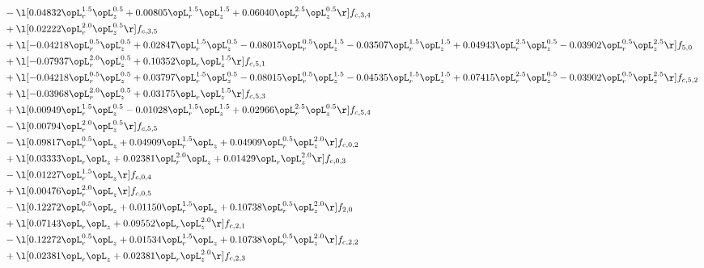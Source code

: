\begin{alignat}{2}
& - \l[  0.04832 \opL_r^{1.5} \opL_z^{0.5} +  0.00805 \opL_r^{1.5} \opL_z^{1.5} +  0.06040 \opL_r^{2.5} \opL_z^{0.5}  \r] f_{c,3,4} \nonumber \\ 
& + \l[  0.02222 \opL_r^{2.0} \opL_z^{0.5}  \r] f_{c,3,5} \nonumber \\ 
& + \l[  -0.04218 \opL_r^{0.5} \opL_z^{0.5} +  0.02847 \opL_r^{1.5} \opL_z^{0.5}   -0.08015 \opL_r^{0.5} \opL_z^{1.5}   -0.03507 \opL_r^{1.5} \opL_z^{1.5} +  0.04943 \opL_r^{2.5} \opL_z^{0.5}   -0.03902 \opL_r^{0.5} \opL_z^{2.5}  \r] f_{5,0} \nonumber \\ 
& + \l[  -0.07937 \opL_r^{2.0} \opL_z^{0.5} +  0.10352 \opL_r \opL_z^{1.5}  \r] f_{c,5,1} \nonumber \\ 
& + \l[  -0.04218 \opL_r^{0.5} \opL_z^{0.5} +  0.03797 \opL_r^{1.5} \opL_z^{0.5}   -0.08015 \opL_r^{0.5} \opL_z^{1.5}   -0.04535 \opL_r^{1.5} \opL_z^{1.5} +  0.07415 \opL_r^{2.5} \opL_z^{0.5}   -0.03902 \opL_r^{0.5} \opL_z^{2.5}  \r] f_{c,5,2} \nonumber \\ 
& + \l[  -0.03968 \opL_r^{2.0} \opL_z^{0.5} +  0.03175 \opL_r \opL_z^{1.5}  \r] f_{c,5,3} \nonumber \\ 
& + \l[  0.00949 \opL_r^{1.5} \opL_z^{0.5}   -0.01028 \opL_r^{1.5} \opL_z^{1.5} +  0.02966 \opL_r^{2.5} \opL_z^{0.5}  \r] f_{c,5,4} \nonumber \\ 
& - \l[  0.00794 \opL_r^{2.0} \opL_z^{0.5}  \r] f_{c,5,5} \nonumber \\ 
& - \l[  0.09817 \opL_r^{0.5} \opL_z +  0.04909 \opL_r^{1.5} \opL_z +  0.04909 \opL_r^{0.5} \opL_z^{2.0}  \r] f_{c,0,2} \nonumber \\ 
& + \l[  0.03333 \opL_r \opL_z +  0.02381 \opL_r^{2.0} \opL_z +  0.01429 \opL_r \opL_z^{2.0}  \r] f_{c,0,3} \nonumber \\ 
& - \l[  0.01227 \opL_r^{1.5} \opL_z  \r] f_{c,0,4} \nonumber \\ 
& + \l[  0.00476 \opL_r^{2.0} \opL_z  \r] f_{c,0,5} \nonumber \\ 
& - \l[  0.12272 \opL_r^{0.5} \opL_z +  0.01150 \opL_r^{1.5} \opL_z +  0.10738 \opL_r^{0.5} \opL_z^{2.0}  \r] f_{2,0} \nonumber \\ 
& + \l[  0.07143 \opL_r \opL_z +  0.09552 \opL_r \opL_z^{2.0}  \r] f_{c,2,1} \nonumber \\ 
& - \l[  0.12272 \opL_r^{0.5} \opL_z +  0.01534 \opL_r^{1.5} \opL_z +  0.10738 \opL_r^{0.5} \opL_z^{2.0}  \r] f_{c,2,2} \nonumber \\ 
& + \l[  0.02381 \opL_r \opL_z +  0.02381 \opL_r \opL_z^{2.0}  \r] f_{c,2,3} \nonumber \\ 

\end{alignat}
